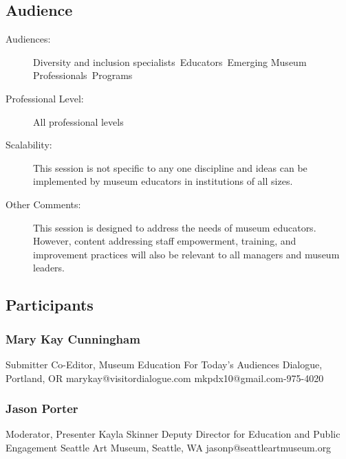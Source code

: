 \documentclass{report}
\begin{document}
              \subsection*{Audience}
                \begin{description}
                  \item [Audiences:]Diversity and inclusion specialists~Educators~Emerging Museum Professionals~Programs~
                  \item[Professional Level:]All professional levels~
                \item[Scalability:] This session is not specific to any one discipline and ideas can be implemented by museum educators in institutions of all sizes. 

							
              \item[Other Comments:] This session is designed to address the needs of museum educators. However, content addressing staff empowerment, training, and improvement practices will also be relevant to all managers and museum leaders.
              \end{description}
            \subsection*{Participants}
              \subsubsection*{ Mary Kay Cunningham }
              Submitter\newline
              Co-Editor, Museum Education For Today's Audiences\newline
              Dialogue, Portland, OR
              \newline
              marykay@visitordialogue.com\newline
              mkpdx10@gmail.com-975-4020\newline

              


              
                \subsubsection*{ Jason Porter }
                Moderator, Presenter\newline
                Kayla Skinner Deputy Director for Education and Public Engagement\newline
                Seattle Art Museum, Seattle, WA
                \newline
                jasonp@seattleartmuseum.org\newline
                
\end{document}
